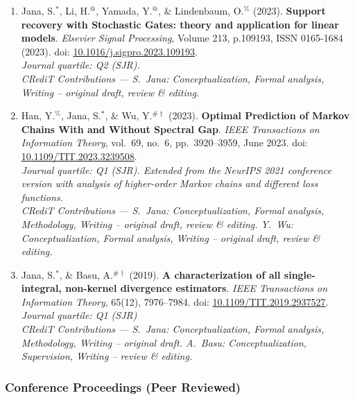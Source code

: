 \documentclass[letterpaper,oneside]{article}
\begin{document}
\begin{enumerate}[leftmargin=*,label=J\arabic*.]
  \item Jana, S.$^*$, Li, H.$^@$, Yamada, Y.$^@$, \& Lindenbaum, O.$^\%$ (2023). {\textbf{Support recovery with Stochastic Gates: theory and application for linear models}}. \textit{Elsevier Signal Processing}, Volume 213, p.109193, ISSN 0165-1684 (2023). doi: \href{https://doi.org/10.1016/j.sigpro.2023.109193}{10.1016/j.sigpro.2023.109193}.\\
  \textit{Journal quartile: Q2 (SJR).}\\
  \textit{CRediT Contributions --- S.~Jana: Conceptualization, Formal analysis, Writing -- original draft, review \& editing.}

  \item Han, Y.$^\%$, Jana, S.$^*$, \& Wu, Y.$^{\#\dagger}$ (2023). {\textbf{Optimal Prediction of Markov Chains With and Without Spectral Gap}}. \textit{IEEE Transactions on Information Theory}, vol.\ 69, no.\ 6, pp.\ 3920--3959, June 2023. doi: \href{https://doi.org/10.1109/TIT.2023.3239508}{10.1109/TIT.2023.3239508}.\\
  \textit{Journal quartile: Q1 (SJR). Extended from the NeurIPS 2021 conference version with analysis of higher-order Markov chains and different loss functions.}\\
  \textit{CRediT Contributions --- S.~Jana: Conceptualization, Formal analysis, Methodology, Writing -- original draft, review \& editing. Y.~Wu: Conceptualization, Formal analysis, Writing -- original draft, review \& editing.}

  \item Jana, S.$^*$, \& Basu, A.$^{\#\dagger}$ (2019). {\textbf{A characterization of all single-integral, non-kernel divergence estimators}}. \textit{IEEE Transactions on Information Theory}, 65(12), 7976--7984. doi: \href{https://doi.org/10.1109/TIT.2019.2937527}{10.1109/TIT.2019.2937527}.\\
  \textit{Journal quartile: Q1 (SJR)}\\
  \textit{CRediT Contributions --- S.~Jana: Conceptualization, Formal analysis, Methodology, Writing -- original draft. A.~Basu: Conceptualization, Supervision, Writing -- review \& editing.}

\end{enumerate}
%
%

\subsubsection*{Conference Proceedings (Peer Reviewed)}
\end{document}
